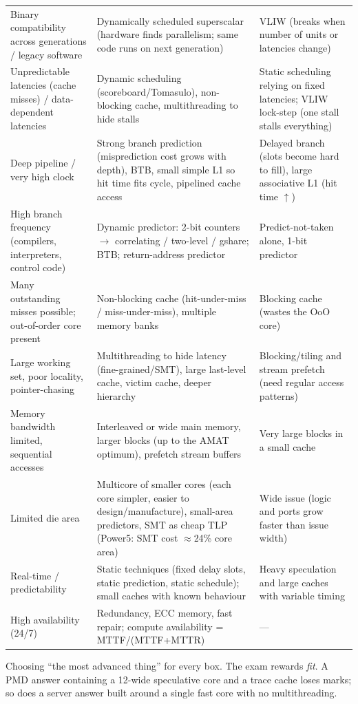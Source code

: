 \begin{longtable}{L{3.6cm}L{6.3cm}L{6.4cm}}
\addlinespace
Binary compatibility across generations / legacy software &
Dynamically scheduled superscalar (hardware finds parallelism; same code runs on next generation) &
VLIW (breaks when number of units or latencies change) \\
\addlinespace
Unpredictable latencies (cache misses) / data-dependent latencies &
Dynamic scheduling (scoreboard/Tomasulo), non-blocking cache, multithreading to hide stalls &
Static scheduling relying on fixed latencies; VLIW lock-step (one stall stalls everything) \\
\addlinespace
Deep pipeline / very high clock &
Strong branch prediction (misprediction cost grows with depth), BTB, small simple L1 so hit time fits cycle, pipelined cache access &
Delayed branch (slots become hard to fill), large associative L1 (hit time $\uparrow$) \\
\addlinespace
High branch frequency (compilers, interpreters, control code) &
Dynamic predictor: 2-bit counters $\rightarrow$ correlating / two-level / gshare; BTB; return-address predictor &
Predict-not-taken alone, 1-bit predictor \\
\addlinespace
Many outstanding misses possible; out-of-order core present &
Non-blocking cache (hit-under-miss / miss-under-miss), multiple memory banks &
Blocking cache (wastes the OoO core) \\
\addlinespace
Large working set, poor locality, pointer-chasing &
Multithreading to hide latency (fine-grained/SMT), large last-level cache, victim cache, deeper hierarchy &
Blocking/tiling and stream prefetch (need regular access patterns) \\
\addlinespace
Memory bandwidth limited, sequential accesses &
Interleaved or wide main memory, larger blocks (up to the AMAT optimum), prefetch stream buffers &
Very large blocks in a small cache \\
\addlinespace
Limited die area &
Multicore of smaller cores (each core simpler, easier to design/manufacture), small-area predictors, SMT as cheap TLP (Power5: SMT cost $\approx$24\% core area) &
Wide issue (logic and ports grow faster than issue width) \\
\addlinespace
Real-time / predictability &
Static techniques (fixed delay slots, static prediction, static schedule); small caches with known behaviour\bs{} &
Heavy speculation and large caches with variable timing\bs{} \\
\addlinespace
High availability (24/7) &
Redundancy, ECC memory, fast repair; compute availability = MTTF/(MTTF+MTTR) &
--- \\
\bottomrule
\end{longtable}
\normalsize

\begin{trap}
Choosing ``the most advanced thing'' for every box. The exam rewards \emph{fit}. A PMD answer containing a 12-wide speculative core and a trace cache loses marks; so does a server answer built around a single fast core with no multithreading.
\end{trap}

